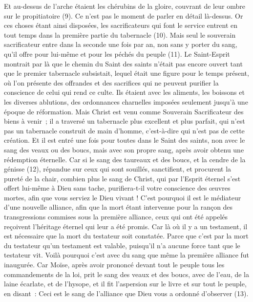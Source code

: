 \begin{multicols}{2}
Et au-dessus de l'arche étaient les chérubins de la gloire, couvrant de leur ombre sur le propitiatoire (9). Ce n’est pas le moment de parler en détail là-dessus.
Or ces choses étant ainsi disposées, les sacrificateurs qui font le service entrent en tout temps dans la première partie du tabernacle (10).
Mais seul le souverain sacrificateur entre dans la seconde une fois par an, non sans y porter du sang, qu’il offre pour lui-même et pour les péchés du peuple (11).
Le Saint-Esprit montrait par là que le chemin du Saint des saints n'était pas encore ouvert tant que le premier tabernacle subsistait,
lequel était une figure pour le temps présent, où l’on présente des offrandes et des sacrifices qui ne peuvent purifier la conscience de celui qui rend ce culte.
Ils étaient avec les aliments, les boissons et les diverses ablutions, des ordonnances charnelles imposées seulement jusqu’à une époque de réformation.
Mais Christ est venu comme Souverain Sacrificateur des biens à venir ; il a traversé un tabernacle plus excellent et plus parfait, qui n'est pas un tabernacle construit de main d’homme, c'est-à-dire qui n’est pas de cette création.
Et il est entré une fois pour toutes dans le Saint des saints, non avec le sang des veaux ou des boucs, mais avec son propre sang, après avoir obtenu une rédemption éternelle.
Car si le sang des taureaux et des boucs, et la cendre de la génisse (12), répandue sur ceux qui sont souillés, sanctifient, et procurent la pureté de la chair,
combien plus le sang de Christ, qui par l'Esprit éternel s'est offert lui-même à Dieu sans tache, purifiera-t-il votre conscience des œuvres mortes, afin que vous serviez le Dieu vivant !
C'est pourquoi il est le médiateur d’une nouvelle alliance, afin que la mort étant intervenue pour la rançon des transgressions commises sous la première alliance, ceux qui ont été appelés reçoivent l’héritage éternel qui leur a été promis.
Car là où il y a un testament, il est nécessaire que la mort du testateur soit constatée.
Parce que c'est par la mort du testateur qu'un testament est valable, puisqu’il n'a aucune force tant que le testateur vit.
Voilà pourquoi c’est avec du sang que même la première alliance fut inaugurée.
Car Moïse, après avoir prononcé devant tout le peuple tous les commandements de la loi, prit le sang des veaux et des boucs, avec de l'eau, de la laine écarlate, et de l'hysope, et il fit l’aspersion sur le livre et sur tout le peuple, en disant :
Ceci est le sang de l’alliance que Dieu vous a ordonné d'observer (13).

\end{multicols}
